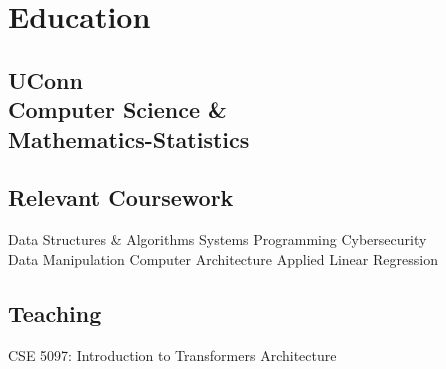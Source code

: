 \documentclass[]{resume-template}
\begin{document}
%
%
    \lastupdated{}

%
%

%
%

    \begin{minipage}[t]{0.33\textwidth}


        \section{Education}\label{sec:education}

        \subsection{UConn\\ Computer Science \&\\
        Mathematics-Statistics}\label{subsec:uconn}
        \vspace{\topsep}

        \subsection{Relevant Coursework}\label{subsec:coursework}
        Data Structures \& Algorithms \textbullet{} Systems Programming \textbullet{} Cybersecurity \textbullet{}\\ Data Manipulation \textbullet{}
        Computer Architecture \textbullet{} Applied Linear Regression
        \sectionsep{}

        \subsection{Teaching}\label{subsec:teaching}
        CSE 5097: Introduction to Transformers Architecture




\end{minipage}
\end{document}
